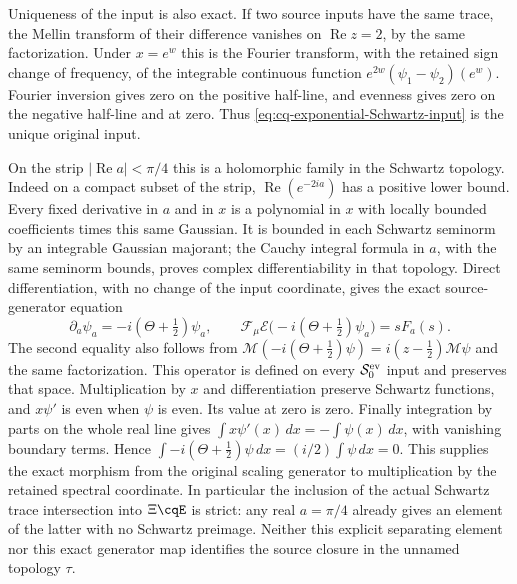 Uniqueness of the input is also exact. If two source inputs have
the same trace, the Mellin transform of their difference vanishes
on $\operatorname{Re}z=2$, by the same factorization. Under
$x=e^w$ this is the Fourier transform, with the retained sign
change of frequency, of the integrable continuous function
$e^{2w}(\psi_1-\psi_2)(e^w)$. Fourier inversion gives zero
on the positive half-line, and evenness gives zero on the negative
half-line and at zero. Thus \eqref{eq:cq-exponential-Schwartz-input}
is the unique original input.

On the strip $|\operatorname{Re}a|<\pi/4$ this is a holomorphic
family in the Schwartz topology. Indeed on a compact subset of
the strip, $\operatorname{Re}(e^{-2ia})$ has a positive lower
bound. Every fixed derivative in $a$ and in $x$ is a polynomial
in $x$ with locally bounded coefficients times this same Gaussian.
It is bounded in each Schwartz seminorm by an integrable Gaussian
majorant; the Cauchy integral formula in $a$, with the same
seminorm bounds, proves complex differentiability in that topology.
Direct differentiation, with no change of the input coordinate,
gives the exact source-generator equation
\begin{equation}\label{eq:cq-exponential-source-generator}
 \partial_a\psi_a=-i(\Theta+\tfrac12)\psi_a,\qquad
 \mathcal F_\mu\mathcal E\bigl(-i(\Theta+\tfrac12)\psi_a\bigr)
                                      =sF_a(s).
\end{equation}
The second equality also follows from
$\mathcal M(-i(\Theta+\tfrac12)\psi)
=i(z-\tfrac12)\mathcal M\psi$ and the same factorization.
This operator is defined on every $\mathcal S_0^{\rm ev}$ input
and preserves that space. Multiplication by $x$ and differentiation
preserve Schwartz functions, and $x\psi'$ is even when $\psi$ is even.
Its value at zero is zero. Finally integration by parts on the
whole real line gives $\int x\psi'(x)\,dx=-\int\psi(x)\,dx$,
with vanishing boundary terms. Hence
$\int-i(\Theta+\tfrac12)\psi\,dx=(i/2)\int\psi\,dx=0$.
This supplies the exact morphism from the original scaling
generator to multiplication by the retained spectral coordinate.
In particular the inclusion of the actual Schwartz trace
intersection into $\Xi\cqE$ is strict: any real $a=\pi/4$
already gives an element of the latter with no Schwartz preimage.
Neither this explicit separating element nor this exact generator
map identifies the source closure in the unnamed topology $\tau$.
